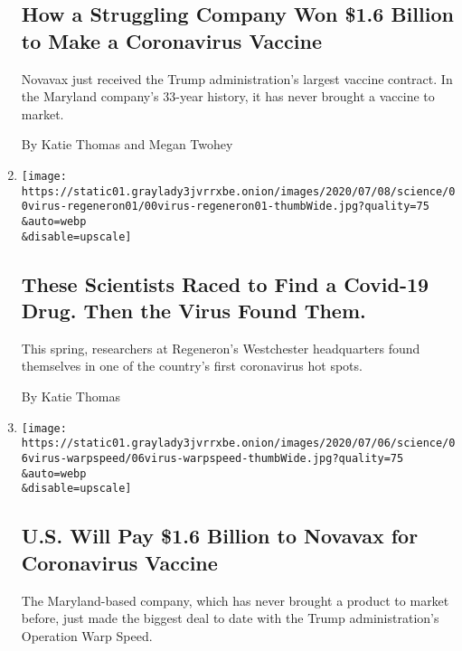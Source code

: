 \begin{enumerate}
  \hypertarget{how-a-struggling-company-won-16-billion-to-make-a-coronavirus-vaccine}{%
  \subsection{How a Struggling Company Won \$1.6 Billion to Make a
  Coronavirus
  Vaccine}\label{how-a-struggling-company-won-16-billion-to-make-a-coronavirus-vaccine}}

  Novavax just received the Trump administration's largest vaccine
  contract. In the Maryland company's 33-year history, it has never
  brought a vaccine to market.

  By Katie Thomas and Megan Twohey
\item
  \href{/2020/07/09/health/regeneron-monoclonal-antibodies.html}{}

  \texttt{[image: https://static01.graylady3jvrrxbe.onion/images/2020/07/08/science/00virus-regeneron01/00virus-regeneron01-thumbWide.jpg?quality=75\\\&auto=webp\\\&disable=upscale]}

  \hypertarget{these-scientists-raced-to-find-a-covid-19-drug-then-the-virus-found-them}{%
  \subsection{These Scientists Raced to Find a Covid-19 Drug. Then the
  Virus Found
  Them.}\label{these-scientists-raced-to-find-a-covid-19-drug-then-the-virus-found-them}}

  This spring, researchers at Regeneron's Westchester headquarters found
  themselves in one of the country's first coronavirus hot spots.

  By Katie Thomas
\item
  \href{/2020/07/07/health/novavax-coronavirus-vaccine-warp-speed.html}{}

  \texttt{[image: https://static01.graylady3jvrrxbe.onion/images/2020/07/06/science/06virus-warpspeed/06virus-warpspeed-thumbWide.jpg?quality=75\\\&auto=webp\\\&disable=upscale]}

  \hypertarget{us-will-pay-16-billion-to-novavax-for-coronavirus-vaccine}{%
  \subsection{U.S. Will Pay \$1.6 Billion to Novavax for Coronavirus
  Vaccine}\label{us-will-pay-16-billion-to-novavax-for-coronavirus-vaccine}}

  The Maryland-based company, which has never brought a product to
  market before, just made the biggest deal to date with the Trump
  administration's Operation Warp Speed.


\end{enumerate}
